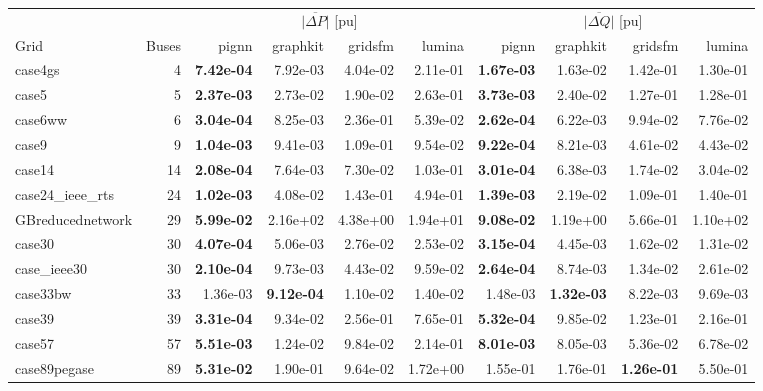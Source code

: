 \documentclass[10pt]{article}
\begin{document}
\begin{table}[H]
\centering\small
\setlength{\tabcolsep}{3.5pt}
\begin{tabular}{lr rrrr rrrr}
\toprule
 & & \multicolumn{4}{c}{$\overline{|\Delta P|}$ [pu]} & \multicolumn{4}{c}{$\overline{|\Delta Q|}$ [pu]} \\
\cmidrule(lr){3-6}\cmidrule(lr){7-10}
Grid & Buses & pignn & graphkit & gridsfm & lumina & pignn & graphkit & gridsfm & lumina \\
\midrule
case4gs & 4 & \textbf{7.42e-04} & 7.92e-03 & 4.04e-02 & 2.11e-01 & \textbf{1.67e-03} & 1.63e-02 & 1.42e-01 & 1.30e-01 \\
case5 & 5 & \textbf{2.37e-03} & 2.73e-02 & 1.90e-02 & 2.63e-01 & \textbf{3.73e-03} & 2.40e-02 & 1.27e-01 & 1.28e-01 \\
case6ww & 6 & \textbf{3.04e-04} & 8.25e-03 & 2.36e-01 & 5.39e-02 & \textbf{2.62e-04} & 6.22e-03 & 9.94e-02 & 7.76e-02 \\
case9 & 9 & \textbf{1.04e-03} & 9.41e-03 & 1.09e-01 & 9.54e-02 & \textbf{9.22e-04} & 8.21e-03 & 4.61e-02 & 4.43e-02 \\
case14 & 14 & \textbf{2.08e-04} & 7.64e-03 & 7.30e-02 & 1.03e-01 & \textbf{3.01e-04} & 6.38e-03 & 1.74e-02 & 3.04e-02 \\
case24\_ieee\_rts & 24 & \textbf{1.02e-03} & 4.08e-02 & 1.43e-01 & 4.94e-01 & \textbf{1.39e-03} & 2.19e-02 & 1.09e-01 & 1.40e-01 \\
GBreducednetwork & 29 & \textbf{5.99e-02} & 2.16e+02 & 4.38e+00 & 1.94e+01 & \textbf{9.08e-02} & 1.19e+00 & 5.66e-01 & 1.10e+02 \\
case30 & 30 & \textbf{4.07e-04} & 5.06e-03 & 2.76e-02 & 2.53e-02 & \textbf{3.15e-04} & 4.45e-03 & 1.62e-02 & 1.31e-02 \\
case\_ieee30 & 30 & \textbf{2.10e-04} & 9.73e-03 & 4.43e-02 & 9.59e-02 & \textbf{2.64e-04} & 8.74e-03 & 1.34e-02 & 2.61e-02 \\
case33bw & 33 & 1.36e-03 & \textbf{9.12e-04} & 1.10e-02 & 1.40e-02 & 1.48e-03 & \textbf{1.32e-03} & 8.22e-03 & 9.69e-03 \\
case39 & 39 & \textbf{3.31e-04} & 9.34e-02 & 2.56e-01 & 7.65e-01 & \textbf{5.32e-04} & 9.85e-02 & 1.23e-01 & 2.16e-01 \\
case57 & 57 & \textbf{5.51e-03} & 1.24e-02 & 9.84e-02 & 2.14e-01 & \textbf{8.01e-03} & 8.05e-03 & 5.36e-02 & 6.78e-02 \\
case89pegase & 89 & \textbf{5.31e-02} & 1.90e-01 & 9.64e-02 & 1.72e+00 & 1.55e-01 & 1.76e-01 & \textbf{1.26e-01} & 5.50e-01 \\

\end{tabular}
\end{table}
\end{document}
